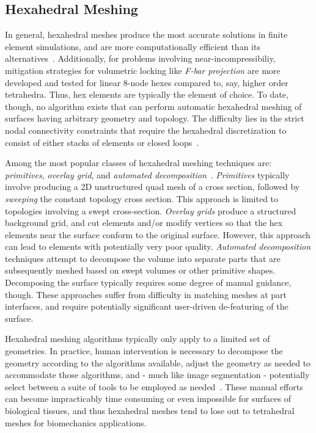\subsection{Hexahedral Meshing}
\label{Hexahedral Meshing}

In general, hexahedral meshes produce the most accurate solutions in finite element simulations, and are more computationally efficient than its alternatives~\cite{tautges_2001}. Additionally, for problems involving near-incompressibiliy, mitigation strategies for volumetric locking like \textit{F-bar projection} are more developed and tested for linear 8-node hexes compared to, say, higher order tetrahedra. Thus, hex elements are typically the element of choice. To date, though, no algorithm exists that can perform automatic hexahedral meshing of surfaces having arbitrary geometry and topology. The difficulty lies in the strict nodal connectivity constraints that require the hexahedral discretization to consist of either stacks of elements or closed loops~\cite{young_2008}. 

Among the most popular classes of hexahedral meshing techniques are: \textit{primitives}, \textit{overlay grid}, and \textit{automated decomposition}~\cite{blacker_2001}. \textit{Primitives} typically involve producing a 2D unstructured quad mesh of a cross section, followed by \textit{sweeping} the constant topology cross section. This approach is limited to topologies involving a swept cross-section. \textit{Overlay grids} produce a structured background grid, and cut elements and/or modify vertices so that the hex elements near the surface conform to the original surface. However, this approach can lead to elements with potentially very poor quality. \textit{Automated decomposition} techniques attempt to decompose the volume into separate parts that are subsequently meshed based on swept volumes or other primitive shapes. Decomposing the surface typically requires some degree of manual guidance, though. These approaches suffer from difficulty in matching meshes at part interfaces, and require potentially significant user-driven de-featuring of the surface.

Hexahedral meshing algorithms typically only apply to a limited set of geometries. In practice, human intervention is necessary to decompose the geometry according to the algorithms available, adjust the geometry as needed to accommodate those algorithms, and - much like image segmentation - potentially select between a suite of tools to be employed as needed~\cite{blacker_2001}. These manual efforts can become impracticably time consuming or even impossible for surfaces of biological tissues, and thus hexahedral meshes tend to lose out to tetrahedral meshes for biomechanics applications.

